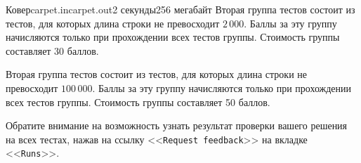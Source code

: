 \begin{problem}{Ковер}{carpet.in}{carpet.out}{2 секунды}{256 мегабайт}
Вторая группа тестов состоит из тестов, для которых длина строки не превосходит $2\,000$. Баллы 
за эту группу начисляются только при прохождении всех тестов группы. Стоимость группы составляет 30 баллов.

Вторая группа тестов состоит из тестов, для которых длина строки не превосходит $100\,000$. Баллы 
за эту группу начисляются только при прохождении всех тестов группы. Стоимость группы составляет 50 баллов.

Обратите внимание на возможность узнать результат проверки вашего решения на всех тестах, 
нажав на ссылку <<\texttt{Request feedback}>> на вкладке <<\texttt{Runs}>>.

\end{problem}